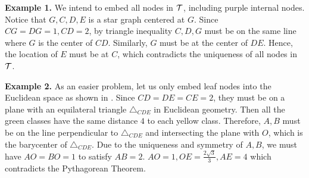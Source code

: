 \textbf{Example 1.} We intend to embed all nodes in ${\mathcal{T}}$, including purple internal nodes. Notice that $G,C,D,E$ is a star graph centered at $G$. Since $CG = DG = 1, CD = 2$, by triangle inequality $C,D,G$ must be on the same line where $G$ is the center of $CD$. Similarly, $G$ must be at the center of $DE$. Hence, the location of $E$ must be at $C$, which contradicts the uniqueness of all nodes in ${\mathcal{T}}$.

\textbf{Example 2.} As an easier problem, let us only embed leaf nodes into the Euclidean space as shown in . Since $CD = DE = CE = 2$, they must be on a plane with an equilateral triangle $\triangle_{CDE}$ in Euclidean geometry. Then all the green classes have the same distance $4$ to each yellow class. Therefore, $A,B$ must be on the line perpendicular to $\triangle_{CDE}$ and intersecting the plane with $O$, which is the barycenter of $\triangle_{CDE}$. Due to the uniqueness and symmetry of $A,B$, we must have $AO = BO = 1$ to satisfy $AB = 2$. $AO = 1, OE = \frac{2\sqrt{3}}{3}, AE = 4$ which contradicts the Pythagorean Theorem.

